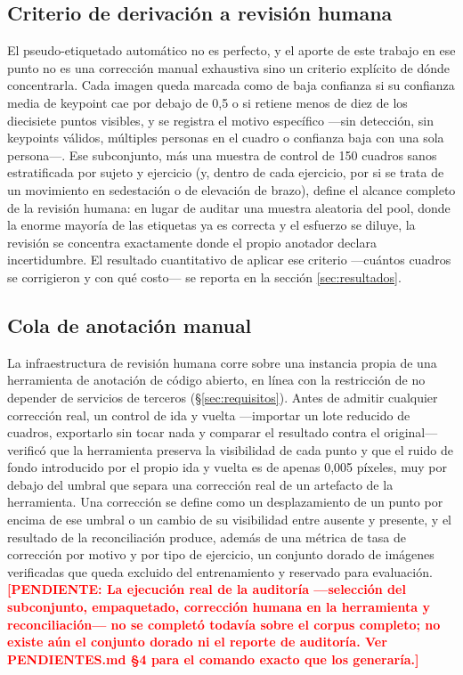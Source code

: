 \documentclass[10pt,a4paper,twocolumn]{article}
\newcommand{\pendiente}[1]{\textcolor{red}{\textbf{[PENDIENTE: #1]}}}
\begin{document}
\subsection{Criterio de derivación a revisión humana}
El pseudo-etiquetado automático no es perfecto, y el aporte de este trabajo en
ese punto no es una corrección manual exhaustiva sino un criterio explícito
de dónde concentrarla. Cada imagen queda marcada como de baja confianza si su
confianza media de keypoint cae por debajo de 0,5 o si retiene menos de diez
de los diecisiete puntos visibles, y se registra el motivo específico —sin
detección, sin keypoints válidos, múltiples personas en el cuadro o
confianza baja con una sola persona—. Ese subconjunto, más una muestra de
control de 150 cuadros sanos estratificada por sujeto y ejercicio (y, dentro
de cada ejercicio, por si se trata de un movimiento en sedestación o de
elevación de brazo), define el alcance completo de la revisión humana: en
lugar de auditar una muestra aleatoria del pool, donde la enorme mayoría de
las etiquetas ya es correcta y el esfuerzo se diluye, la revisión se
concentra exactamente donde el propio anotador declara incertidumbre. El
resultado cuantitativo de aplicar ese criterio —cuántos cuadros se
corrigieron y con qué costo— se reporta en la sección \ref{sec:resultados}.

\subsection{Cola de anotación manual}
La infraestructura de revisión humana corre sobre una instancia propia de una
herramienta de anotación de código abierto, en línea con la restricción de no
depender de servicios de terceros (\S\ref{sec:requisitos}). Antes de admitir
cualquier corrección real, un control de ida y vuelta —importar un lote
reducido de cuadros, exportarlo sin tocar nada y comparar el resultado contra
el original— verificó que la herramienta preserva la visibilidad de cada
punto y que el ruido de fondo introducido por el propio ida y vuelta es de
apenas 0,005 píxeles, muy por debajo del umbral que separa una corrección
real de un artefacto de la herramienta. Una corrección se define como un
desplazamiento de un punto por encima de ese umbral o un cambio de su
visibilidad entre ausente y presente, y el resultado de la reconciliación
produce, además de una métrica de tasa de corrección por motivo y por tipo de
ejercicio, un conjunto dorado de imágenes verificadas que queda excluido del
entrenamiento y reservado para evaluación. \pendiente{La ejecución real de la
auditoría —selección del subconjunto, empaquetado, corrección humana en la
herramienta y reconciliación— no se completó todavía sobre el corpus
completo; no existe aún el conjunto dorado ni el reporte de auditoría. Ver
PENDIENTES.md \S4 para el comando exacto que los generaría.}
\end{document}
